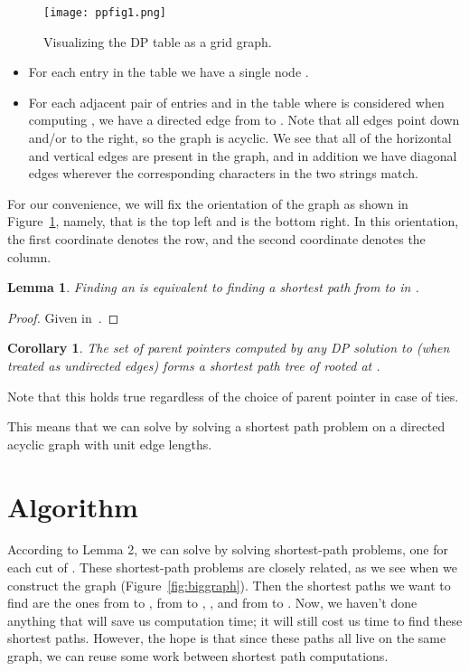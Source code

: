 \documentclass{article}
\newtheorem{lemma}{Lemma}
\newtheorem{corollary}{Corollary}
\begin{document}
\begin{figure}[htb]
\centering
\texttt{[image: ppfig1.png]}
\caption{Visualizing the DP table as a grid graph.}
\label{fig:tabletograph}
\end{figure}

\begin{itemize}
\item For each entry  in the table we have a single node .
\item For each adjacent pair of entries  and  in the table where  is considered when computing , we have a directed edge from  to .  Note that all edges point down and/or to the right, so the graph is acyclic.  We see that all of the horizontal and vertical edges are present in the graph, and in addition we have diagonal edges wherever the corresponding characters in the two strings match.
\end{itemize}

For our convenience, we will fix the orientation of the graph as shown in Figure~\ref{fig:tabletograph}, namely, that  is the top left and  is the bottom right.  In this orientation, the first coordinate denotes the row, and the second coordinate denotes the column.

\begin{lemma}
Finding an  is equivalent to finding a shortest path from  to  in .
\end{lemma}
\begin{proof}
Given in~\cite{M90}.
\end{proof}

\begin{corollary}
The set of parent pointers computed by any DP solution to  (when treated as undirected edges) forms a shortest path tree of  rooted at .
\end{corollary}

Note that this holds true regardless of the choice of parent pointer in case of ties.

This means that we can solve  by solving a shortest path problem on a directed acyclic graph with unit edge lengths.

\section{Algorithm}

According to Lemma 2, we can solve  by solving  shortest-path problems, one for each cut of .  These shortest-path problems are closely related, as we see when we construct the graph  (Figure~\ref{fig:biggraph}).  Then the shortest paths we want to find are the ones from  to , from  to , , and from  to .  Now, we haven't done anything that will save us computation time; it will still cost us  time to find these  shortest paths.  However, the hope is that since these paths all live on the same graph, we can reuse some work between shortest path computations.
\end{document}
